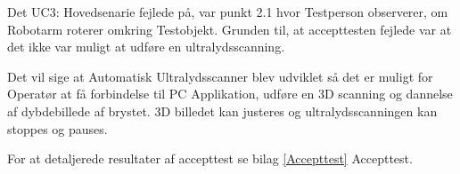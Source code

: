 Det UC3: Hovedsenarie fejlede på, var punkt 2.1 hvor Testperson observerer, om Robotarm roterer omkring Testobjekt. Grunden til, at accepttesten fejlede var at det ikke var muligt at udføre en ultralydsscanning.  

Det vil sige at Automatisk Ultralydsscanner blev udviklet så det er muligt for Operatør at få forbindelse til PC Applikation, udføre en 3D scanning og dannelse af dybdebillede af brystet.  3D billedet kan justeres og ultralydsscanningen kan stoppes og pauses. 

For at detaljerede resultater af accepttest se bilag \ref{Accepttest} Accepttest. 